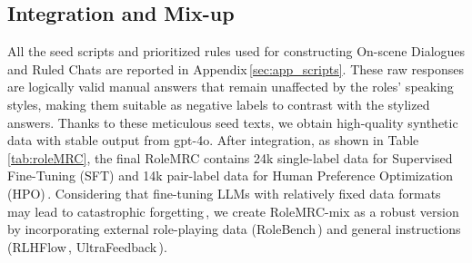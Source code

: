 \subsection{Integration and Mix-up}
All the seed scripts and prioritized rules used for constructing On-scene Dialogues and Ruled Chats are reported in Appendix\,\ref{sec:app_scripts}. These raw responses are logically valid manual answers that remain unaffected by the roles' speaking styles, making them suitable as negative labels to contrast with the stylized answers. Thanks to these meticulous seed texts, we obtain high-quality synthetic data with stable output from gpt-4o. After integration, as shown in Table\,\ref{tab:roleMRC}, the final RoleMRC contains 24k single-label data for Supervised Fine-Tuning (SFT) and 14k pair-label data for Human Preference Optimization (HPO)\,\cite{ouyang2022training,rafailov2023direct,sampo,hong2024reference}. Considering that fine-tuning LLMs with relatively fixed data formats may lead to catastrophic forgetting\,\cite{kirkpatrick2017overcoming}, we create RoleMRC-mix as a robust version by incorporating external role-playing data (RoleBench\,\cite{wang2023rolellm}) and general instructions (RLHFlow\,\cite{dong2024rlhf}, UltraFeedback\,\cite{cui2023ultrafeedback}).
